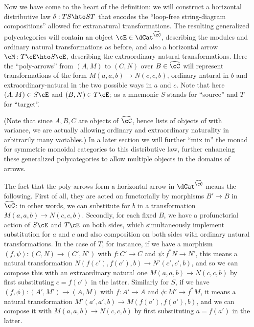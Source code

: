 \documentclass{amsart}
\newcommand{\C}{\cC}
\renewcommand{\Chat}{\ensuremath{\widehat{\C}}\xspace}
\newcommand{\E}{\cE}
\begin{document}
Now we have come to the heart of the definition: we will construct a horizontal distributive law $\delta : TS \hto ST$ that encodes the ``loop-free string-diagram compositions'' allowed for extranatural transformations.
The resulting generalized polycategories will contain an object $\E\in \dCat^{\Chat}$, describing the modules and ordinary natural transformations as before, and also a horizontal arrow $\cM: T\E \hto S\E$, describing the extraordinary natural transformations.
Here the ``poly-arrows'' from $(A,M)$ to $(C,N)$ over $B\in\Chat$ will represent transformations of the form $M(a,a,b) \to N(c,c,b)$, ordinary-natural in $b$ and extraordinary-natural in the two possible ways in $a$ and $c$.
Note that here $(A,M)\in S\E$ and $(B,N)\in T\E$; as a mnemonic $S$ stands for ``source'' and $T$ for ``target''.

(Note that since $A,B,C$ are objects of $\Chat$, hence lists of objects of \C with variance, we are actually allowing ordinary and extraordinary naturality in arbitrarily many variables.)
In a later section we will further ``mix in'' the monad for symmetric monoidal categories to this distributive law, further enhancing these generalized polycategories to allow multiple objects in the domains of arrows.

The fact that the poly-arrows form a horizontal arrow \cM in $\dCat^{\Chat}$ means the following.
First of all, they are acted on functorially by morphisms $B'\to B$ in $\Chat$: in other words, we can substitute for $b$ in a transformation $M(a,a,b) \to N(c,c,b)$.
Secondly, for each fixed $B$, we have a profunctorial action of $S\E$ and $T\E$ on both sides, which simultaneously implement substitution for $a$ and $c$ and also composition on both sides with ordinary natural transformations.
In the case of $T$, for instance, if we have a morphism $(f,\psi) : (C,N)\to (C',N')$ with $f:C'\to C$ and $\psi : f^* N \to N'$, this means a natural transformation $N(f(c'),f(c'),b) \to N'(c',c',b)$, and so we can compose this with an extraordinary natural one $M(a,a,b) \to N(c,c,b)$ by first substituting $c=f(c')$ in the latter.
Similarly for $S$, if we have $(f,\phi) : (A',M')\to (A,M)$ with $f:A'\to A$ and $\phi : M' \to f^*M$, it means a natural transformation $M'(a',a',b) \to M(f(a'),f(a'),b)$, and we can compose it with $M(a,a,b) \to N(c,c,b)$ by first substituting $a=f(a')$ in the latter.
\end{document}
